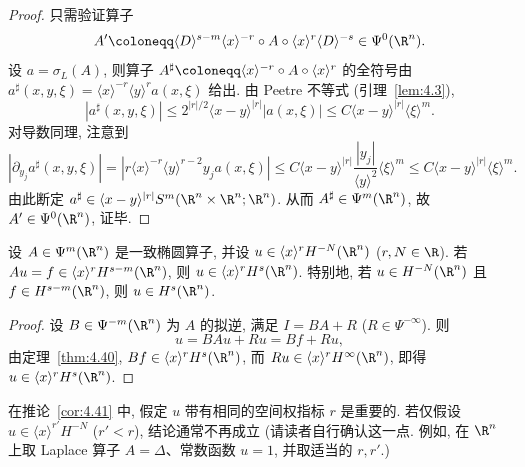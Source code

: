 \begin{proof}
只需验证算子
\begin{equation}\label{eq:4.125}
    A' \defeq \langle D \rangle^{s-m} \langle x \rangle^{-r} \circ A \circ \langle x \rangle^r \langle D \rangle^{-s} \in \Psi^0(\R^n).
\end{equation}
设 $a = \sigma_L(A)$, 则算子 $A^\sharp \defeq \langle x \rangle^{-r} \circ A \circ \langle x \rangle^r$ 的全符号由 $a^\sharp(x, y, \xi) = \langle x \rangle^{-r} \langle y \rangle^r a(x, \xi)$ 给出. 由 Peetre 不等式 (引理~\ref{lem:4.3}),
\begin{equation}\label{eq:4.126}
    |a^\sharp(x, y, \xi)| \le 2^{|r|/2} \langle x - y \rangle^{|r|} |a(x, \xi)| \le C \langle x - y \rangle^{|r|} \langle \xi \rangle^m.
\end{equation}
对导数同理, 注意到
\begin{equation}\label{eq:4.127}
    |\partial_{y_j} a^\sharp(x, y, \xi)| = |r \langle x \rangle^{-r} \langle y \rangle^{r-2} y_j a(x, \xi)| \le C \langle x - y \rangle^{|r|} \frac{|y_j|}{\langle y \rangle^2} \langle \xi \rangle^m \le C \langle x - y \rangle^{|r|} \langle \xi \rangle^m.
\end{equation}
由此断定 $a^\sharp \in \langle x - y \rangle^{|r|} S^m(\R^n \times \R^n; \R^n)$. 从而 $A^\sharp \in \Psi^m(\R^n)$, 故 $A' \in \Psi^0(\R^n)$, 证毕.
\end{proof}

\begin{corollary}\label{cor:4.41}
设 $A \in \Psi^m(\R^n)$ 是一致椭圆算子, 并设 $u \in \langle x \rangle^r H^{-N}(\R^n)$ ($r, N \in \R$). 若 $A u = f \in \langle x \rangle^r H^{s-m}(\R^n)$, 则 $u \in \langle x \rangle^r H^s(\R^n)$. 特别地, 若 $u \in H^{-N}(\R^n)$ 且 $f \in H^{s-m}(\R^n)$, 则 $u \in H^s(\R^n)$.
\end{corollary}

\begin{proof}
设 $B \in \Psi^{-m}(\R^n)$ 为 $A$ 的拟逆, 满足 $I = B A + R$ ($R \in \Psi^{-\infty}$). 则
\begin{equation}\label{eq:4.128}
    u = B A u + R u = B f + R u,
\end{equation}
由定理~\ref{thm:4.40}, $B f \in \langle x \rangle^r H^s(\R^n)$, 而 $R u \in \langle x \rangle^r H^\infty(\R^n)$, 即得 $u \in \langle x \rangle^r H^s(\R^n)$.
\end{proof}

\begin{remark}[加权空间中的先验归属]\label{rem:4.42}
在推论~\ref{cor:4.41} 中, 假定 $u$ 带有相同的空间权指标 $r$ 是重要的. 若仅假设 $u \in \langle x \rangle^{r'} H^{-N}$ ($r' < r$), 结论通常不再成立 (请读者自行确认这一点. 例如, 在 $\R^n$ 上取 Laplace 算子 $A = \Delta$、常数函数 $u = 1$, 并取适当的 $r, r'$.)
\end{remark}

